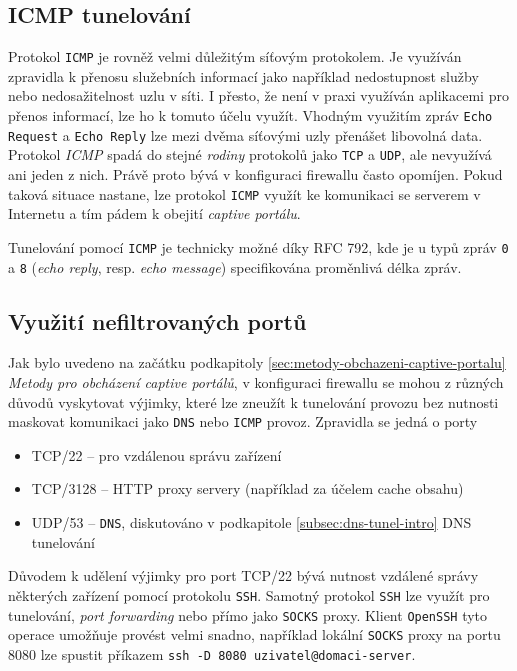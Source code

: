 \documentclass[thesis=M,czech]{FITthesis}[2012/10/20]
\begin{document}
\subsection{ICMP tunelování}

Protokol \texttt{ICMP} je rovněž velmi důležitým síťovým protokolem. Je využíván zpravidla k přenosu služebních informací jako například nedostupnost služby nebo nedosažitelnost uzlu v síti. I přesto, že není v praxi využíván aplikacemi pro přenos informací, lze ho k tomuto účelu využít. Vhodným využitím zpráv \texttt{Echo Request} a \texttt{Echo Reply} lze mezi dvěma síťovými uzly přenášet libovolná data. Protokol \textit{ICMP} spadá do stejné \textit{rodiny} protokolů jako \texttt{TCP} a \texttt{UDP}, ale nevyužívá ani jeden z nich. Právě proto bývá v konfiguraci firewallu často opomíjen. Pokud taková situace nastane, lze protokol \texttt{ICMP} využít ke komunikaci se serverem v Internetu a tím pádem k obejití \textit{captive portálu}.

Tunelování pomocí \texttt{ICMP} je technicky možné díky RFC 792\cite{rfc792}, kde je u typů zpráv \texttt{0} a \texttt{8} (\textit{echo reply}, resp. \textit{echo message}) specifikována proměnlivá délka zpráv.

\subsection{Využití nefiltrovaných portů}

Jak bylo uvedeno na začátku podkapitoly \ref{sec:metody-obchazeni-captive-portalu} \textit{Metody pro obcházení captive portálů}, v konfiguraci firewallu se mohou z různých důvodů vyskytovat výjimky, které lze zneužít k tunelování provozu bez nutnosti maskovat komunikaci jako \texttt{DNS} nebo \texttt{ICMP} provoz. Zpravidla\cite{defcon-captive-article} se jedná o porty 

\begin{itemize}
 \item TCP/22 -- pro vzdálenou správu zařízení
 \item TCP/3128 -- HTTP proxy servery (například za účelem cache obsahu)
 \item UDP/53 -- \texttt{DNS}, diskutováno v podkapitole \ref{subsec:dns-tunel-intro} DNS tunelování
\end{itemize}

Důvodem k udělení výjimky pro port TCP/22 bývá nutnost vzdálené správy některých zařízení pomocí protokolu \texttt{SSH}. Samotný protokol \texttt{SSH} lze využít pro tunelování, \textit{port forwarding} nebo přímo jako \texttt{SOCKS} proxy. Klient \texttt{OpenSSH} tyto operace umožňuje provést velmi snadno, například lokální \texttt{SOCKS} proxy na portu 8080 lze spustit příkazem \texttt{ssh -D 8080 uzivatel@domaci-server}.
\end{document}
